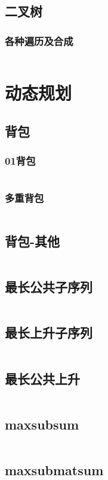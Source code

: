 \documentclass[a4paper,11pt]{article}
\begin{document}
\subsection{二叉树}
\subsubsection{各种遍历及合成}
\inputminted[breaklines]{c++}{ds/bitree.cpp}

\section{动态规划}

\subsection{背包}
\subsubsection{01背包}	
\inputminted[breaklines]{c++}{dp/01bag.cpp}
\subsubsection{多重背包}
\inputminted[breaklines]{c++}{dp/multibag.cpp}
\subsection{背包-其他}
\inputminted[breaklines]{c++}{dp/bag_others.cpp}
\subsection{最长公共子序列}
\inputminted[breaklines]{c++}{dp/lcs.cpp}

\subsection{最长上升子序列}
\inputminted[breaklines]{c++}{dp/lis.cpp}
\subsection{最长公共上升}
\inputminted[breaklines]{c++}{dp/lcis.cpp}
\subsection{maxsubsum}
\inputminted[breaklines]{c++}{dp/max_sub_sum.cpp}
\subsection{maxsubmatsum}
\inputminted[breaklines]{c++}{dp/max_sub_mat_sum.cpp}
\end{document}
